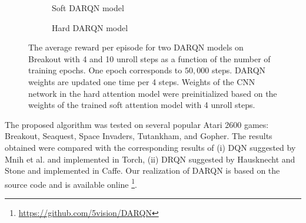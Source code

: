 \documentclass{article} \usepackage{nips15submit_e,times}
\begin{document}
\begin{figure}
     \begin{subfigure}[b]{0.50\textwidth}
          \centering
          \caption{Soft DARQN model}
          \label{fig:soft}
     \end{subfigure}
     \begin{subfigure}[b]{0.50\textwidth}
          \centering
          \caption{Hard DARQN model}
          \label{fig:hard}
     \end{subfigure}
	\caption{The average reward per episode for two DARQN models on Breakout with 4 and 10 unroll steps as a function of the number of training epochs. One epoch corresponds to $50,000$ steps. DARQN weights are updated one time per 4 steps. Weights of the CNN network in the hard attention model were preinitialized based on the weights of the trained soft attention model with 4 unroll steps.}
	\label{fig:unroll}
\end{figure}

The proposed algorithm was tested on several popular Atari 2600 games: Breakout, Seaquest, Space Invaders, Tutankham, and Gopher. The results obtained were compared with the corresponding results of (i) DQN suggested by Mnih et al. \cite{mnih2015human} and implemented in Torch, (ii) DRQN suggested by Hausknecht and Stone \cite{hausknecht2015drqn} and implemented in Caffe. Our realization of DARQN is based on the source code \cite{mnih2015human} and is available online \footnote{\url{https://github.com/5vision/DARQN}}.
\end{document}
